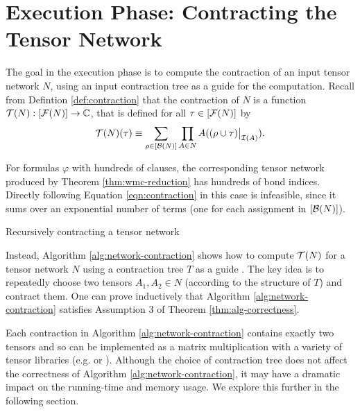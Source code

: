 \section{Execution Phase: Contracting the Tensor Network}
\label{sec:tensors:execution}
The goal in the execution phase is to compute the contraction of an input tensor network $N$, using an input contraction tree as a guide for the computation. Recall from Defintion \ref{def:contraction} that the contraction of $N$ is a function $\mathcal{T}(N) : [\mathcal{F}(N)] \rightarrow \mathbb{C}$, that is defined for all $\tau \in [\mathcal{F}(N)]$ by
		\begin{equation}
		\label{eqn:contraction}
        \mathcal{T}(N)(\tau) \equiv \sum_{\rho \in [\mathcal{B}(N)]} \prod_{A \in N} A((\rho \cup \tau)\big|_{\mathcal{I}(A)}).
        \end{equation}

For formulas $\varphi$ with hundreds of clauses, the corresponding tensor network produced by Theorem \ref{thm:wmc-reduction} has hundreds of bond indices. Directly following Equation \ref{eqn:contraction} in this case is infeasible, since it sums over an exponential number of terms (one for each assignment in $[\mathcal{B}(N)]$).

\begin{algorithm*}[t]
    \caption{Recursively contracting a tensor network}
    \label{alg:network-contraction}
    
    \DontPrintSemicolon
\end{algorithm*}

Instead, Algorithm \ref{alg:network-contraction} shows how to compute $\mathcal{T}(N)$ for a tensor network $N$ using a contraction tree $T$ as a guide \cite{EP14}. The key idea is to repeatedly choose two tensors $A_1, A_2 \in N$ (according to the structure of $T$) and contract them. One can prove inductively that Algorithm \ref{alg:network-contraction} satisfies Assumption 3 of Theorem \ref{thm:alg-correctness}.

Each contraction in Algorithm \ref{alg:network-contraction} contains exactly two tensors and so can be implemented as a matrix multiplication with a variety of tensor libraries (e.g.  \cite{numpy} or  \cite{ABCCDDDGII16}).
Although the choice of contraction tree does not affect the correctness of Algorithm \ref{alg:network-contraction}, it may have a dramatic impact on the running-time and memory usage. We explore this further in the following section.

